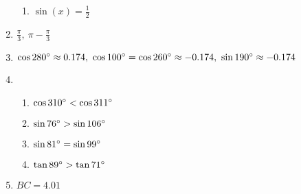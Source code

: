 \documentclass{article}
\begin{document}
\begin{enumerate}
\begin{enumerate}
	\item $\sin{(x)} = \frac{1}{2}$
	
	\end{enumerate}

\item $\frac{\pi}{3}, \ \pi - \frac{\pi}{3}$

\item $\cos{280 \degree} \approx 0.174, \ \cos{100 \degree} = \cos{260 \degree} \approx -0.174, \ \sin{190 \degree} \approx -0.174$

\item

	\begin{enumerate}
	
	\item $\cos{310\degree} < \cos{311\degree}$
	
	\item $\sin{76\degree} > \sin{106\degree}$
	
	\item $\sin{81\degree} = \sin{99\degree}$
	
	\item $\tan{89\degree} > \tan{71\degree}$
	
	\end{enumerate}
	
\item $BC = 4.01$

\end{enumerate}
\end{document}
